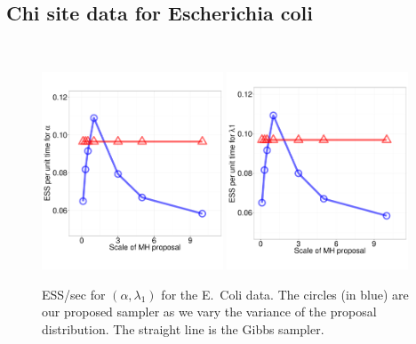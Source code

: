 {  \subsection{Chi site data for Escherichia coli}~
  \begin{figure}%
  \centering
  \begin{minipage}[!hp]{.01\linewidth}
    \hspace{.1in}
  \end{minipage}
  \begin{minipage}[!hp]{.98\linewidth}
    \includegraphics [width=0.48\textwidth, angle=0]{figs/ECOLI_alpha.pdf}
    \includegraphics [width=0.48\textwidth, angle=0]{figs/ECOLI_l1.pdf}
  \end{minipage}  
    \caption{ESS/sec for $(\alpha,\lambda_1)$ for the E.\ Coli data. The circles (in blue) are our 
      proposed sampler as we vary the variance of the proposal distribution. 
      The straight line is the Gibbs sampler. }
     \label{fig:ECOLI}


\end{figure}}
